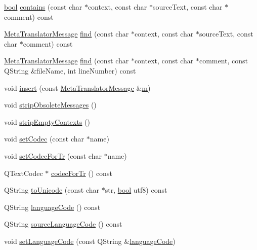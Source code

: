 \begin{DoxyCompactItemize}
\hyperlink{compiler_8h_abb452686968e48b67397da5f97445f5b}{bool} \hyperlink{classMetaTranslator_a576274a034461e0054cd314228391230}{contains} (const char $\ast$context, const char $\ast$source\+Text, const char $\ast$comment) const 
\item 
\hyperlink{classMetaTranslatorMessage}{Meta\+Translator\+Message} \hyperlink{classMetaTranslator_a38ec3c28ebc6bd642f05e6d28c946589}{find} (const char $\ast$context, const char $\ast$source\+Text, const char $\ast$comment) const 
\item 
\hyperlink{classMetaTranslatorMessage}{Meta\+Translator\+Message} \hyperlink{classMetaTranslator_a2df7a4a1b4755e38ba28a14ca16ad3e1}{find} (const char $\ast$context, const char $\ast$comment, const Q\+String \&file\+Name, int line\+Number) const 
\item 
void \hyperlink{classMetaTranslator_aa284dd7f3a10389769f61874e7236e5d}{insert} (const \hyperlink{classMetaTranslatorMessage}{Meta\+Translator\+Message} \&\hyperlink{indexexpr_8h_ab72fdb4031d47b75ab26dd18a437bcdc}{m})
\item 
void \hyperlink{classMetaTranslator_a3b4b6a569414e9c4224829414ca4a180}{strip\+Obsolete\+Messages} ()
\item 
void \hyperlink{classMetaTranslator_a22080e2bda3afdc0d6a5258dcea37406}{strip\+Empty\+Contexts} ()
\item 
void \hyperlink{classMetaTranslator_a1aa773ea94d377dbe9a0150dc90fc1c9}{set\+Codec} (const char $\ast$name)
\item 
void \hyperlink{classMetaTranslator_a00bf7fa55e126bc4dd82f3039699ebb2}{set\+Codec\+For\+Tr} (const char $\ast$name)
\item 
Q\+Text\+Codec $\ast$ \hyperlink{classMetaTranslator_a5728906c05d799ae7b03a97fedce50c2}{codec\+For\+Tr} () const 
\item 
Q\+String \hyperlink{classMetaTranslator_ab5c961c144399b7c4f1a62bf3c8474b8}{to\+Unicode} (const char $\ast$str, \hyperlink{compiler_8h_abb452686968e48b67397da5f97445f5b}{bool} utf8) const 
\item 
Q\+String \hyperlink{classMetaTranslator_aa7f2a95fe50a464cf3c3da6a0f02d9dd}{language\+Code} () const 
\item 
Q\+String \hyperlink{classMetaTranslator_a920468be07dae99a08309112e5dfbff9}{source\+Language\+Code} () const 
\item 
void \hyperlink{classMetaTranslator_a51033b57a11392889ea0b44a6a665887}{set\+Language\+Code} (const Q\+String \&\hyperlink{classMetaTranslator_aa7f2a95fe50a464cf3c3da6a0f02d9dd}{language\+Code})

\end{DoxyCompactItemize}

